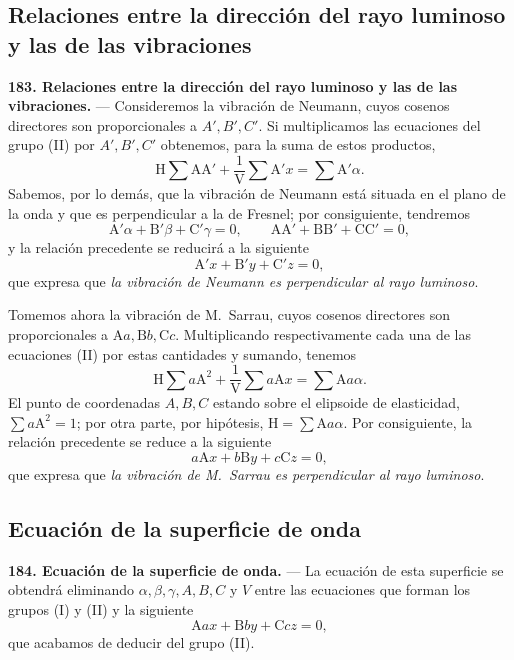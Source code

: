 \subsection{Relaciones entre la dirección del rayo luminoso y las de las
vibraciones}

\noindent\textbf{183. Relaciones entre la dirección del rayo luminoso y
las de las vibraciones.} — Consideremos la vibración de Neumann, cuyos cosenos directores son
proporcionales a $A',B',C'$. Si multiplicamos las ecuaciones del grupo
(II) por $A',B',C'$ obtenemos, para la suma de estos productos,
\[
\mathrm H\sum\mathrm{AA}'+\frac1{\mathrm V}\sum\mathrm A'x=\sum\mathrm A'\alpha.
\]
Sabemos, por lo demás, que la vibración de Neumann está situada en el
plano de la onda y que es perpendicular a la de Fresnel; por consiguiente,
tendremos
\[
\mathrm A'\alpha+\mathrm B'\beta+\mathrm C'\gamma=0,\qquad
\mathrm{AA}'+\mathrm{BB}'+\mathrm{CC}'=0,
\]
y la relación precedente se reducirá a la siguiente
\[
\mathrm A'x+\mathrm B'y+\mathrm C'z=0,
\]
que expresa que \emph{la vibración de Neumann es perpendicular al rayo
luminoso}.

Tomemos ahora la vibración de M.~Sarrau, cuyos cosenos directores son
proporcionales a $\mathrm{A}a,\mathrm{B}b,\mathrm{C}c$. Multiplicando
respectivamente cada una de las ecuaciones (II) por estas cantidades y
sumando, tenemos
\[
\mathrm H\sum a\mathrm A^2+\frac1{\mathrm V}\sum a\mathrm Ax=\sum\mathrm Aa\alpha.
\]
El punto de coordenadas $A,B,C$ estando sobre el elipsoide de elasticidad,
$\sum a\mathrm A^2=1$; por otra parte, por hipótesis, $\mathrm
H=\sum\mathrm Aa\alpha$. Por consiguiente, la relación precedente se
reduce a la siguiente
\[
a\mathrm Ax+b\mathrm By+c\mathrm Cz=0,
\]
que expresa que \emph{la vibración de M.~Sarrau es perpendicular al rayo
luminoso}.

\subsection{Ecuación de la superficie de onda}

\noindent\textbf{184. Ecuación de la superficie de onda.} — La ecuación
de esta superficie se obtendrá eliminando $\alpha,\beta,\gamma,A,B,C$ y
$V$ entre las ecuaciones que forman los grupos (I) y (II) y la siguiente
\begin{equation}
\mathrm{A}ax+\mathrm{B}by+\mathrm{C}cz=0,
\tag{IV}
\end{equation}
que acabamos de deducir del grupo (II).

